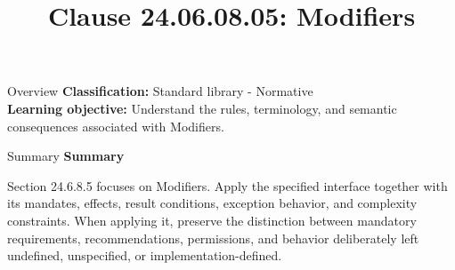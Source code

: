\documentclass[10pt,letterpaper]{article}
\title{Clause 24.06.08.05: Modifiers}
\author{}
\date{}
\begin{document}
\maketitle
\begin{CornellOverviewBox}{Overview}
\textbf{Classification:} Standard library - Normative\\[2pt]
\textbf{Learning objective:} Understand the rules, terminology, and semantic consequences associated with Modifiers.
\end{CornellOverviewBox}\begin{CornellSummaryBox}{Summary}
{\sffamily\bfseries\color{Accent} Summary}\par\vspace{3pt}Section 24.6.8.5 focuses on Modifiers. Apply the specified interface together with its mandates, effects, result conditions, exception behavior, and complexity constraints. When applying it, preserve the distinction between mandatory requirements, recommendations, permissions, and behavior deliberately left undefined, unspecified, or implementation-defined.
\end{CornellSummaryBox}
\end{document}
